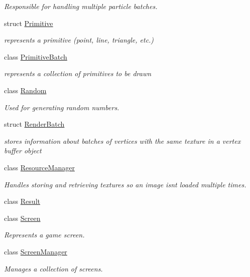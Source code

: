 \begin{DoxyCompactItemize}
\begin{DoxyCompactList}\small\item\em Responsible for handling multiple particle batches. \end{DoxyCompactList}\item 
struct \hyperlink{structnta_1_1Primitive}{Primitive}
\begin{DoxyCompactList}\small\item\em represents a primitive (point, line, triangle, etc.) \end{DoxyCompactList}\item 
class \hyperlink{classnta_1_1PrimitiveBatch}{Primitive\+Batch}
\begin{DoxyCompactList}\small\item\em represents a collection of primitives to be drawn \end{DoxyCompactList}\item 
class \hyperlink{classnta_1_1Random}{Random}
\begin{DoxyCompactList}\small\item\em Used for generating random numbers. \end{DoxyCompactList}\item 
struct \hyperlink{structnta_1_1RenderBatch}{Render\+Batch}
\begin{DoxyCompactList}\small\item\em stores information about batches of vertices with the same texture in a vertex buffer object \end{DoxyCompactList}\item 
class \hyperlink{classnta_1_1ResourceManager}{Resource\+Manager}
\begin{DoxyCompactList}\small\item\em Handles storing and retrieving textures so an image isn\textquotesingle{}t loaded multiple times. \end{DoxyCompactList}\item 
class \hyperlink{classnta_1_1Result}{Result}
\item 
class \hyperlink{classnta_1_1Screen}{Screen}
\begin{DoxyCompactList}\small\item\em Represents a game screen. \end{DoxyCompactList}\item 
class \hyperlink{classnta_1_1ScreenManager}{Screen\+Manager}
\begin{DoxyCompactList}\small\item\em Manages a collection of screens. \end{DoxyCompactList}\item 

\end{DoxyCompactItemize}
